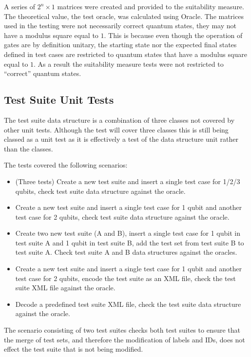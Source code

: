 A series of $2^n\times1$ matrices were created and provided to the suitability measure.
The theoretical value, the test oracle, was calculated using Oracle.
The matrices used in the testing were not necessarily correct quantum states, they may not have a modulus square equal to $1$.
This is because even though the operation of gates are by definition unitary, the starting state nor the expected final states defined in test cases are restricted to quantum states that have a modulus square equal to $1$.
As a result the suitability measure tests were not restricted to ``correct'' quantum states.

\subsection{Test Suite Unit Tests}
\label{sec:testsuitetests}
The test suite data structure is a combination of three classes not covered by other unit tests.
Although the test will cover three classes this is still being classed as a unit test as it is effectively a test of the data structure unit rather than the classes.

The tests covered the following scenarios:
\begin{itemize}
 \item (Three tests) Create a new test suite and insert a single test case for 1/2/3 qubits, check test suite data structure against the oracle.
 \item Create a new test suite and insert a single test case for 1 qubit and another test case for 2 qubits, check test suite data structure against the oracle.
 \item Create two new test suite (A and B), insert a single test case for 1 qubit in test suite A and 1 qubit in test suite B, add the test set from test suite B to test suite A. Check test suite A and B data structures against the oracles.
 \item Create a new test suite and insert a single test case for 1 qubit and another test case for 2 qubits, encode the test suite as an XML file, check the test suite XML file against the oracle.
 \item Decode a predefined test suite XML file, check the test suite data structure against the oracle.
\end{itemize}

The scenario consisting of two test suites checks both test suites to ensure that the merge of test sets, and therefore the modification of labels and IDs, does not effect the test suite that is not being modified.

